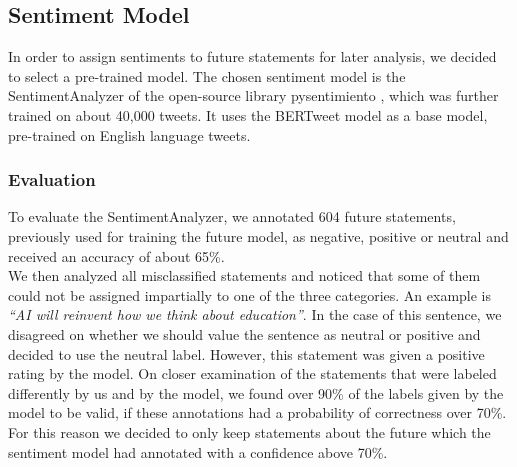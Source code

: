 \subsection{Sentiment Model}
In order to assign sentiments to future statements for later analysis, we decided to select a pre-trained model.
The chosen sentiment model is the SentimentAnalyzer of the open-source library pysentimiento \citep{perez2021pysentimiento}, which was further trained on about 40,000 tweets.
It uses the BERTweet \citep{bertweet} model as a base model, pre-trained on English language tweets.

\subsubsection{Evaluation}
To evaluate the SentimentAnalyzer, we annotated 604 future statements, previously used for training the future model, as negative, positive or neutral and received an accuracy of about 65\%.
\\
We then analyzed all misclassified statements and noticed that some of them could not be assigned impartially to one of the three categories.
An example is \emph{``AI will reinvent how we think about education''}.
In the case of this sentence, we disagreed on whether we should value the sentence as neutral or positive and decided to use the neutral label.
However, this statement was given a positive rating by the model.
On closer examination of the statements that were labeled differently by us and by the model, we found over 90\% of the labels given by the model to be valid, if these annotations had a probability of correctness over 70\%.
For this reason we decided to only keep statements about the future which the sentiment model had annotated with a confidence above 70\%.


